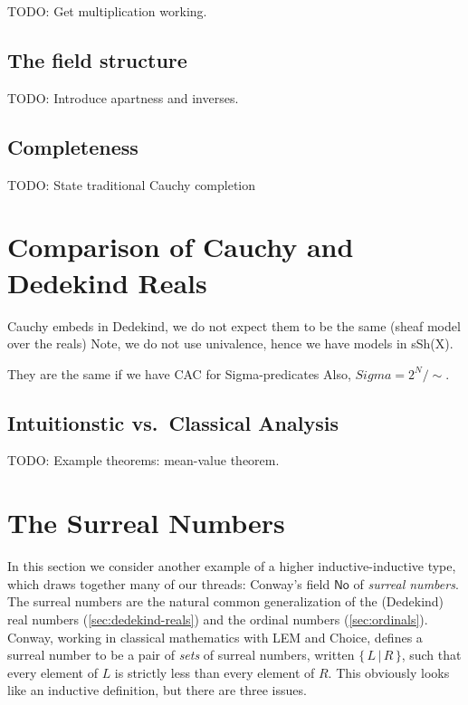 TODO: Get multiplication working.

\subsection{The field structure}
\label{sec:field-structure}

TODO: Introduce apartness and inverses.

\subsection{Completeness}
\label{sec:completeness-RC}

TODO: State traditional Cauchy completion



\section{Comparison of Cauchy and Dedekind Reals}
\label{sec:comp-cacuhy-dedek}

Cauchy embeds in Dedekind, we do not expect them to be the same (sheaf model over the
reals) Note, we do not use univalence, hence we have models in sSh(X).

They are the same if we have CAC for Sigma-predicates
Also, $Sigma = 2^N/\sim$.


\subsection{Intuitionstic vs.\ Classical Analysis}
\label{sec:intuitionistic-vs-classical-analysis}

TODO: Example theorems: mean-value theorem.


\section{The Surreal Numbers}
\label{sec:surreals}

\newcommand{\NO}{\ensuremath{\mathsf{No}}\xspace}
\newcommand{\surr}[2]{\{\,#1\,\big|\,#2\,\}}
\newcommand{\LL}{\mathcal{L}}
\newcommand{\RR}{\mathcal{R}}

In this section we consider another example of a higher inductive-inductive type, which draws together many of our threads: Conway's field \NO of \emph{surreal numbers}.
The surreal numbers are the natural common generalization of the (Dedekind) real numbers (\autoref{sec:dedekind-reals}) and the ordinal numbers (\autoref{sec:ordinals}).
Conway, working in classical mathematics with LEM and Choice, defines a surreal number to be a pair of \emph{sets} of surreal numbers, written $\surr L R$, such that every element of $L$ is strictly less than every element of $R$.
This obviously looks like an inductive definition, but there are three issues.

